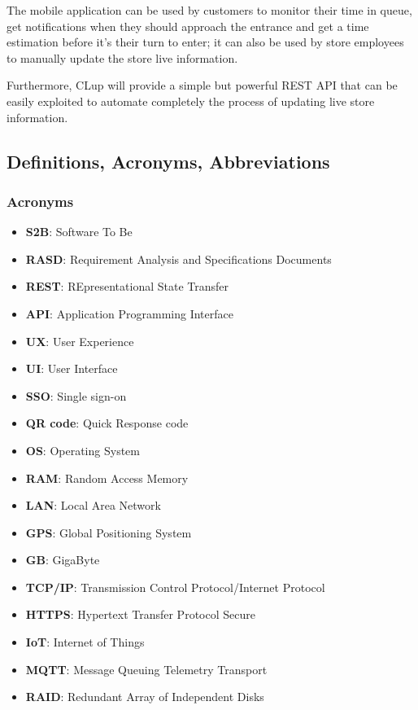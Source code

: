 \medskip

The mobile application can be used by customers to monitor their time in queue, get notifications when they should approach the entrance and get a time estimation before it's their turn to enter; it can also be used by store employees to manually update the store live information.

\medskip

Furthermore, CLup will provide a simple but powerful REST API that can be easily exploited to automate completely the process of updating live store information.

\vfill

\pagebreak

\subsection{Definitions, Acronyms, Abbreviations}

\subsubsection{Acronyms}

\begin{itemize}
      \item \textbf{S2B}: Software To Be
      \item \textbf{RASD}: Requirement Analysis and Specifications Documents
      \item \textbf{REST}: REpresentational State Transfer
      \item \textbf{API}: Application Programming Interface
      \item \textbf{UX}: User Experience
      \item \textbf{UI}: User Interface
      \item \textbf{SSO}: Single sign-on
      \item \textbf{QR code}: Quick Response code
      \item \textbf{OS}: Operating System
      \item \textbf{RAM}: Random Access Memory
      \item \textbf{LAN}: Local Area Network
      \item \textbf{GPS}: Global Positioning System
      \item \textbf{GB}: GigaByte
      \item \textbf{TCP/IP}: Transmission Control Protocol/Internet Protocol
      \item \textbf{HTTPS}: Hypertext Transfer Protocol Secure
      \item \textbf{IoT}: Internet of Things
      \item \textbf{MQTT}: Message Queuing Telemetry Transport
      \item \textbf{RAID}: Redundant Array of Independent Disks


\end{itemize}

